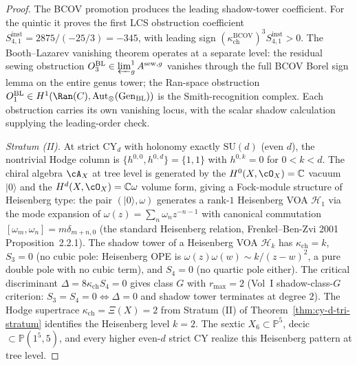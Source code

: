 \begin{proof}
The BCOV promotion produces the leading shadow-tower coefficient. For
the quintic it proves the first LCS obstruction coefficient
$S_{4, 1}^{\mathrm{inst}} = 2875 / (-25/3) = -345$, with leading sign
$(\kappa_{\mathrm{ch}}^{\mathrm{BCOV}})^3 S_{4, 1}^{\mathrm{inst}} > 0$.
The Booth--Lazarev vanishing theorem operates at a separate level: the
residual sewing obstruction
$O_3^{\mathrm{BL}} \in \varprojlim^1_g A^{\mathrm{sew}, g}$ vanishes
through the full BCOV Borel sign lemma on the entire genus tower; the
Ran-space obstruction
$O_1^{\mathrm{BL}} \in H^1(\Ran(C), \mathrm{Aut}_\otimes(\mathrm{Gen}_{\mathrm{BL}}))$
is the Smith-recognition complex. Each obstruction carries its own
vanishing locus, with the scalar shadow calculation supplying the
leading-order check.

\emph{Stratum (II).} At strict CY$_d$ with holonomy exactly
$\mathrm{SU}(d)$ (even $d$), the nontrivial Hodge column is
$\{h^{0, 0}, h^{0, d}\} = \{1, 1\}$ with $h^{0, k} = 0$ for
$0 < k < d$. The chiral algebra $\cA_X$ at tree level is generated by
the $H^0(X, \cO_X) = \mathbb{C}$ vacuum $|0\rangle$ and the
$H^d(X, \cO_X) = \mathbb{C}\omega$ volume form, giving a Fock-module
structure of Heisenberg type: the pair $(|0\rangle, \omega)$ generates
a rank-$1$ Heisenberg VOA $\mathcal{H}_1$ via the mode expansion of
$\omega(z) = \sum_n \omega_n z^{-n - 1}$ with canonical commutation
$[\omega_m, \omega_n] = m \delta_{m + n, 0}$ (the standard Heisenberg
relation, Frenkel--Ben-Zvi 2001 Proposition~2.2.1). The shadow tower
of a Heisenberg VOA $\mathcal{H}_k$ has $\kappa_{\mathrm{ch}} = k$,
$S_3 = 0$ (no cubic pole: Heisenberg OPE is
$\omega(z) \omega(w) \sim k / (z - w)^2$, a pure double pole with no
cubic term), and $S_4 = 0$ (no quartic pole either). The critical
discriminant $\Delta = 8 \kappa_{\mathrm{ch}} S_4 = 0$ gives class $G$
with $r_{\max} = 2$ (Vol~I shadow-class-$G$ criterion: $S_3 = S_4 = 0
\Leftrightarrow \Delta = 0$ and shadow tower terminates at degree $2$).
The Hodge supertrace $\kappa_{\mathrm{ch}} = \Xi(X) = 2$ from Stratum (II)
of Theorem~\ref{thm:cy-d-tri-stratum} identifies the Heisenberg level
$k = 2$. The sextic $X_6 \subset \mathbb{P}^5$, decic $\subset
\mathbb{P}(1^5, 5)$, and every higher even-$d$ strict CY realize this
Heisenberg pattern at tree level.


\end{proof}
